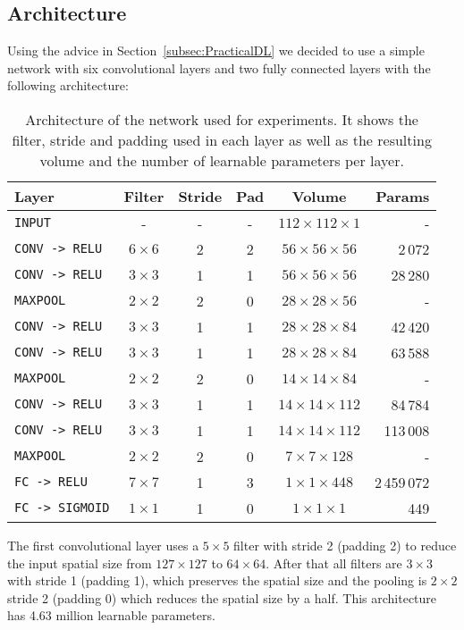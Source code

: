 \subsection{Architecture}
Using the advice in Section~\ref{subsec:PracticalDL} we decided to use a simple network with six convolutional layers and two fully connected layers with the following architecture:
\begin{table}[h]
	\centering
	\begin{tabular}{lccccr}
	\hline
	\textbf{Layer} & \textbf{Filter} & \textbf{Stride} &\textbf{Pad} & \textbf{Volume} & \textbf{Params} \\
	\hline
	\texttt{INPUT}	& -	& - & - & $112 \times 112 \times 1$ & -\\
	\texttt{CONV -> RELU} & $6 \times 6$ & 2 & 2 & $56 \times 56 \times 56$ & 2\,072\\
	\texttt{CONV -> RELU} & $3 \times 3$ & 1 & 1 & $56 \times 56 \times 56$ & 28\,280\\
	\texttt{MAXPOOL} & $2 \times 2$ & 2 & 0 & $28 \times 28 \times 56$ & -\\
	\texttt{CONV -> RELU} & $3 \times 3$ & 1 & 1 & $28 \times 28 \times 84$ & 42\,420\\
	\texttt{CONV -> RELU} & $3 \times 3$ & 1 & 1 & $28 \times 28 \times 84$ & 63\,588\\
	\texttt{MAXPOOL} & $2 \times 2$ & 2 & 0 & $14 \times 14 \times 84$ & -\\
	\texttt{CONV -> RELU} & $3 \times 3$ & 1 & 1 & $14 \times 14 \times 112$ & 84\,784\\
	\texttt{CONV -> RELU} & $3 \times 3$ & 1 & 1 & $14 \times 14 \times 112$ & 113\,008\\
	\texttt{MAXPOOL} & $2 \times 2$ & 2 & 0 & $7 \times 7 \times 128$ & -\\
	\texttt{FC -> RELU} & $7 \times 7$ & 1 & 3 & $1 \times 1 \times 448$ & 2\,459\,072\\
	\texttt{FC -> SIGMOID} & $1 \times 1$ & 1 & 0 & $1 \times 1 \times 1$ & 449 \\
	\hline
	\end{tabular}
	\label{tab:convNetArchitecture}
	\caption[Selected convolutional network architecture]{Architecture of the network used for experiments. It shows the filter, stride and padding used in each layer as well as the resulting volume and the number of learnable parameters per layer.}
\end{table}

	The first convolutional layer uses a $5 \times 5$ filter with stride 2 (padding 2) to reduce the input spatial size from $127 \times 127$ to $64 \times 64$. After that all filters are $3 \times 3$ with stride 1 (padding 1), which preserves the spatial size and the pooling is $2\times 2$ stride 2 (padding 0) which reduces the spatial size by a half. This architecture has 4.63 million learnable parameters. 

